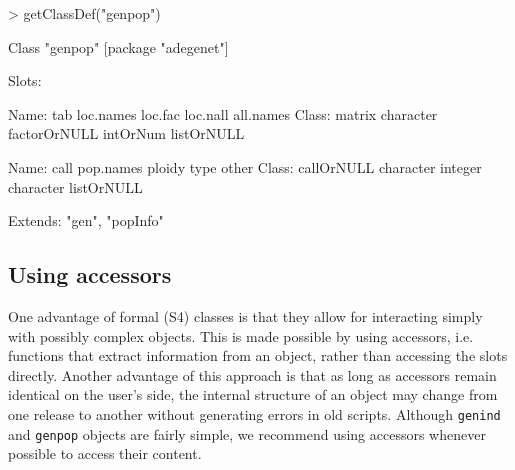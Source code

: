 \documentclass{article}
\begin{document}
\begin{Schunk}
\begin{Sinput}
> getClassDef("genpop")
\end{Sinput}
\begin{Soutput}
Class "genpop" [package "adegenet"]

Slots:
                                                                       
Name:           tab    loc.names      loc.fac     loc.nall    all.names
Class:       matrix    character factorOrNULL     intOrNum   listOrNULL
                                                                       
Name:          call    pop.names       ploidy         type        other
Class:   callOrNULL    character      integer    character   listOrNULL

Extends: "gen", "popInfo"
\end{Soutput}
\end{Schunk}



\subsection{Using accessors}
One advantage of formal (S4) classes is that they allow for interacting simply with possibly complex objects.
This is made possible by using accessors, i.e. functions that extract information from an object,
rather than accessing the slots directly.
Another advantage of this approach is that as long as accessors remain identical on the user's
side, the internal structure of an object may change from one release to another without generating
errors in old scripts.
Although \texttt{genind} and \texttt{genpop} objects are fairly simple, we recommend using accessors whenever possible
to access their content.
\\
\end{document}
